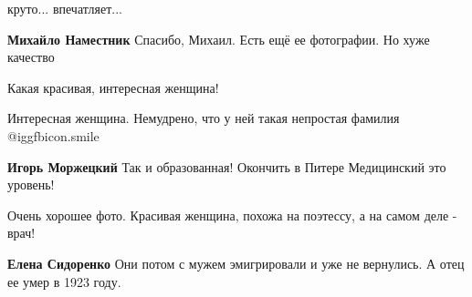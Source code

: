  
 
 
 
 

круто... впечатляет...

\textbf{Михайло Наместник} Спасибо, Михаил. Есть ещё ее фотографии. Но хуже качество

Какая красивая, интересная женщина!


Интересная женщина. Немудрено, что у ней такая непростая фамилия
@igg{fbicon.smile} 

\textbf{Игорь Моржецкий} Так и образованная! Окончить в Питере Медицинский это уровень!


Очень хорошее фото. Красивая женщина, похожа на поэтессу, а на самом деле -
врач!

\textbf{Елена Сидоренко} Они потом с мужем эмигрировали и уже не вернулись. А отец ее умер в 1923 году.
